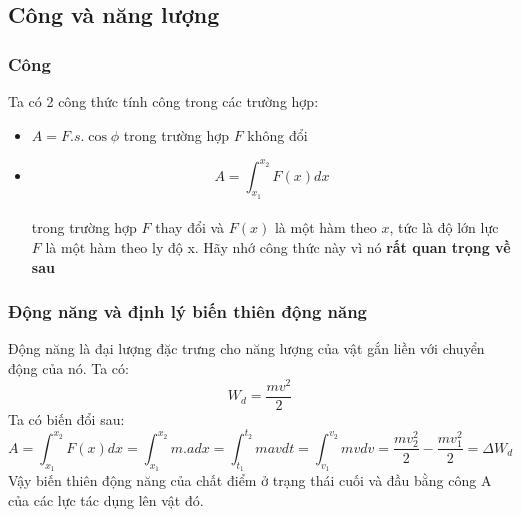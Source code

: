 \subsection{Công và năng lượng}
\subsubsection{Công}
Ta có 2 công thức tính công trong các trường hợp:
\begin{itemize}
    \item $A=F.s.\cos{\phi}$ trong trường hợp $F$ không đổi
    \item $$A=\int_{x_{1}}^{x_{2}}F(x)dx$$ \\ trong trường hợp $F$ thay đổi và $F(x)$ là một hàm theo $x$, tức là độ lớn lực $F$ là một hàm theo ly độ x. Hãy nhớ công thức này vì nó \textbf{rất quan trọng về sau}
\end{itemize}
\subsubsection{Động năng và định lý biến thiên động năng}
Động năng là đại lượng đặc trưng cho năng lượng của vật gắn liền với chuyển động của nó. Ta có: $$W_{d}=\frac{mv^2}{2}$$
Ta có biến đổi sau:
   $$ A=\int_{x_{1}}^{x_{2}}F(x)dx=\int_{x_{1}}^{x_{2}}m.adx=\int_{t_{1}}^{t_{2}}mavdt=\int_{v_{1}}^{v_{2}}mvdv=\frac{mv_{2}^2}{2}-\frac{mv_{1}^2}{2}=\Delta W_{d}$$
Vậy biến thiên động năng của chất điểm ở trạng thái cuối và đầu bằng công A của các lực tác dụng lên vật đó.
